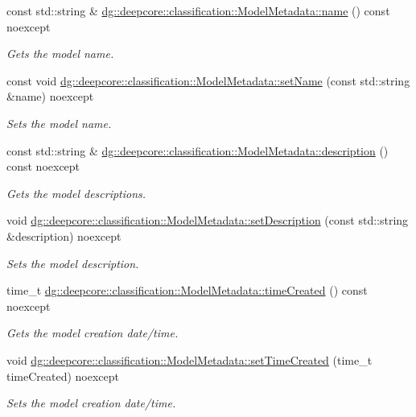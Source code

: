 \begin{DoxyCompactItemize}
const std\+::string \& \hyperlink{group___classification_module_gaf7bb3eef7e80ac756645647def2ee78c}{dg\+::deepcore\+::classification\+::\+Model\+Metadata\+::name} () const noexcept
\begin{DoxyCompactList}\small\item\em Gets the model name. \end{DoxyCompactList}\item 
const void \hyperlink{group___classification_module_ga6cc776b17392c651dfab8be4f72cf06e}{dg\+::deepcore\+::classification\+::\+Model\+Metadata\+::set\+Name} (const std\+::string \&name) noexcept
\begin{DoxyCompactList}\small\item\em Sets the model name. \end{DoxyCompactList}\item 
const std\+::string \& \hyperlink{group___classification_module_ga495686b513e020bf0c809a5db7bfcf9c}{dg\+::deepcore\+::classification\+::\+Model\+Metadata\+::description} () const noexcept
\begin{DoxyCompactList}\small\item\em Gets the model descriptions. \end{DoxyCompactList}\item 
void \hyperlink{group___classification_module_gab541e1fec910b0073658b992b70fec23}{dg\+::deepcore\+::classification\+::\+Model\+Metadata\+::set\+Description} (const std\+::string \&description) noexcept
\begin{DoxyCompactList}\small\item\em Sets the model description. \end{DoxyCompactList}\item 
time\+\_\+t \hyperlink{group___classification_module_ga8e19bae617a659a8999b50a72720228f}{dg\+::deepcore\+::classification\+::\+Model\+Metadata\+::time\+Created} () const noexcept
\begin{DoxyCompactList}\small\item\em Gets the model creation date/time. \end{DoxyCompactList}\item 
void \hyperlink{group___classification_module_ga1a02e568a297cb23eac8ce73e5e5af41}{dg\+::deepcore\+::classification\+::\+Model\+Metadata\+::set\+Time\+Created} (time\+\_\+t time\+Created) noexcept
\begin{DoxyCompactList}\small\item\em Sets the model creation date/time. \end{DoxyCompactList}\item 

\end{DoxyCompactItemize}
